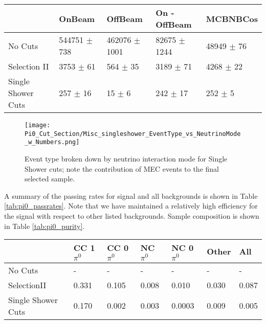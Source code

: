 \documentclass{article}
\begin{document}
\begin{table}[H] 
 \centering
 \begin{tabular}{| l | l | l | l | l |}
  \hline
   & OnBeam & OffBeam & On - OffBeam & MCBNBCos \\ [0.1ex] \hline
No Cuts & 544751 $\pm$ 738 & 462076 $\pm$ 1001 & 82675 $\pm$ 1244 & 48949 $\pm$ 76 \\ 
Selection II & 3753 $\pm$ 61 & 564 $\pm$ 35  & 3189 $\pm$ 71 & 4268 $\pm$ 22  \\ 
Single Shower Cuts & 257 $\pm$ 16 & 15 $\pm$ 6 & 242 $\pm$ 17 & 252 $\pm$ 5  \\ \hline
\end{tabular}
 \end{table}


\begin{figure}[H]
\centering
\texttt{[image: Pi0\_Cut\_Section/Misc\_singleshower\_EventType\_vs\_NeutrinoMode\_w\_Numbers.png]}
\caption{ Event type broken down by neutrino interaction mode for Single Shower cuts; note the contribution of MEC events to the final selected sample. }
\label{fig:physics_singleshower_inttype}
\end{figure}


\par A summary of the passing rates for signal and all backgrounds is shown in Table \ref{tab:pi0_passrates}.  Note that we have maintained a relatively high efficiency for the signal with respect to other listed backgrounds. Sample composition is shown in Table \ref{tab:pi0_purity}. 

\begin{table}[H]
\centering
{}
 \begin{tabular}{| l | l | l |l|l|l|l|}
 \hline
 & CC 1$\pi^0$ & CC 0$\pi^0$ & NC $\pi^0$ & NC 0$\pi^0$ & Other & All \\ [0.1ex] \hline
No Cuts & - & - & - & - & - & -\\
SelectionII & 0.331 & 0.105 & 0.008 & 0.010 & 0.030 & 0.087 \\ 
Single Shower Cuts & 0.170 & 0.002 & 0.003 & 0.0003 & 0.009 & 0.005 \\ \hline
\end{tabular}
\end{table}
\end{document}
